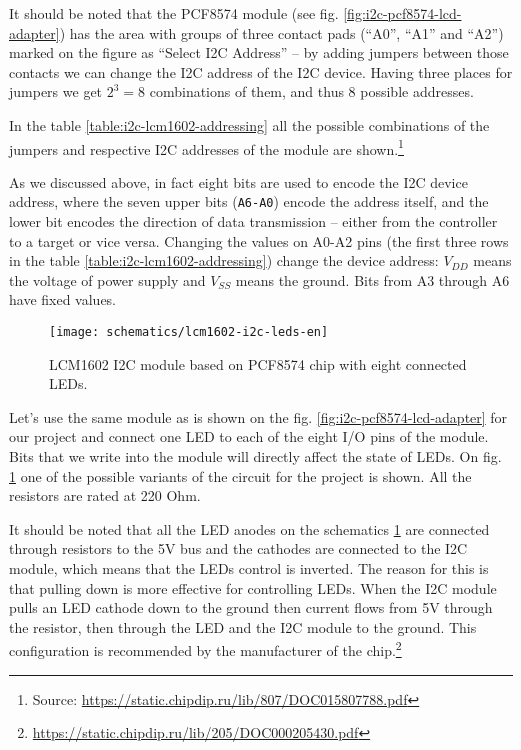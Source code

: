 \documentclass[../sparc.tex]{subfiles}
\begin{document}
It should be noted that the PCF8574 module (see
fig. \ref{fig:i2c-pcf8574-lcd-adapter}) has the area with groups of three
contact pads (``A0'', ``A1'' and ``A2'') marked on the figure as ``Select I2C
Address'' -- by adding jumpers between those contacts we can change the I2C
address of the I2C device.  Having three places for jumpers we get $2^3 = 8$
combinations of them, and thus 8 possible addresses.


In the table \ref{table:i2c-lcm1602-addressing} all the possible combinations of
the jumpers and respective I2C addresses of the module are
shown.\footnote{Source:
\url{https://static.chipdip.ru/lib/807/DOC015807788.pdf}}

As we discussed above, in fact eight bits are used to encode the I2C device
address, where the seven upper bits (\texttt{A6-A0}) encode the address itself,
and the lower bit encodes the direction of data transmission -- either from the
controller to a target or vice versa.  Changing the values on A0-A2 pins (the
first three rows in the table \ref{table:i2c-lcm1602-addressing}) change the
device address: $V_{DD}$ means the voltage of power supply and $V_{SS}$ means
the ground.  Bits from A3 through A6 have fixed values.

\begin{figure}[H]
  \centering
  \texttt{[image: schematics/lcm1602-i2c-leds-en]}
  \caption{LCM1602 I2C module based on PCF8574 chip with eight connected LEDs.}
  \label{fig:lcm1602-i2c-leds}
\end{figure}

Let's use the same module as is shown on the fig.
\ref{fig:i2c-pcf8574-lcd-adapter} for our project and connect one LED to each of
the eight I/O pins of the module.  Bits that we write into the module will
directly affect the state of LEDs.  On fig. \ref{fig:lcm1602-i2c-leds} one of
the possible variants of the circuit for the project is shown.  All the
resistors are rated at 220 Ohm.

It should be noted that all the LED anodes on the schematics
\ref{fig:lcm1602-i2c-leds} are connected through resistors to the 5V bus and the
cathodes are connected to the I2C module, which means that the LEDs control is
inverted.  The reason for this is that pulling down is more effective for
controlling LEDs.  When the I2C module pulls an LED cathode down to the ground
then current flows from 5V through the resistor, then through the LED and the
I2C module to the ground.  This configuration is recommended by the manufacturer
of the chip.\footnote{\url{https://static.chipdip.ru/lib/205/DOC000205430.pdf}}
\end{document}
